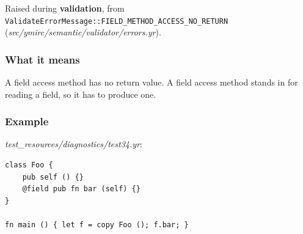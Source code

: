 \label{sec:codes:e4060}

Raised during \textbf{validation}, from \texttt{ValidateErrorMessage::\allowbreak{}FIELD\_\allowbreak{}METHOD\_\allowbreak{}ACCESS\_\allowbreak{}NO\_\allowbreak{}RETURN} (\textit{src/\allowbreak{}ymirc/\allowbreak{}semantic/\allowbreak{}validator/\allowbreak{}errors.yr}).

\subsubsection*{What it means}

A field access method has no return value. A field access method stands in for reading a field, so it has to produce one.

\subsubsection*{Example}

\textit{test\_\allowbreak{}resources/\allowbreak{}diagnostics/\allowbreak{}test34.yr}:

\begin{lstlisting}[style=coloredverbatimError]
class Foo {
    pub self () {}
    @field pub fn bar (self) {}
}

fn main () { let f = copy Foo (); f.bar; }
\end{lstlisting}

